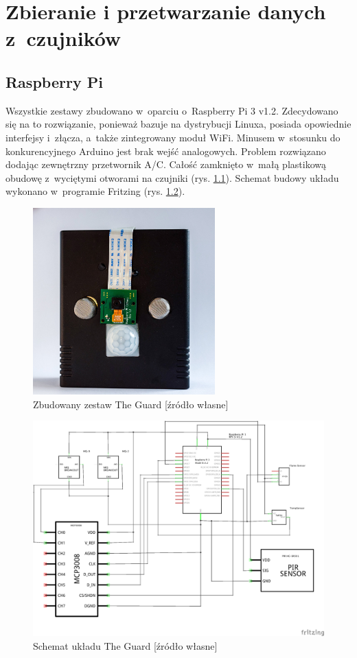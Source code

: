 \chapter{Zbieranie i przetwarzanie danych z~czujników}
\section{Raspberry Pi}
Wszystkie zestawy zbudowano w~oparciu o~Raspberry Pi 3 v1.2. Zdecydowano się na to rozwiązanie, ponieważ bazuje na dystrybucji Linuxa, posiada opowiednie interfejsy i~złącza, a~także zintegrowany moduł WiFi. Minusem w~stosunku do konkurencyjnego Arduino jest brak wejść analogowych. Problem rozwiązano dodając zewnętrzny przetwornik A/C. Całość zamknięto w~małą plastikową obudowę z~wyciętymi otworami na czujniki (rys. \ref{the_guard_set}). Schemat budowy układu wykonano w~programie Fritzing (rys. \ref{the_guard_schem}).
\begin{figure}[H]
	\centering
	\includegraphics[width=7cm]{guard.jpg}
	\caption{Zbudowany zestaw The Guard [źródło własne]}
	\label{the_guard_set}
\end{figure}
\begin{figure}[H]
	\centering
	\includegraphics[width=15cm]{GuardSchem}
	\caption{Schemat układu The Guard [źródło własne]}
	\label{the_guard_schem}
\end{figure}
